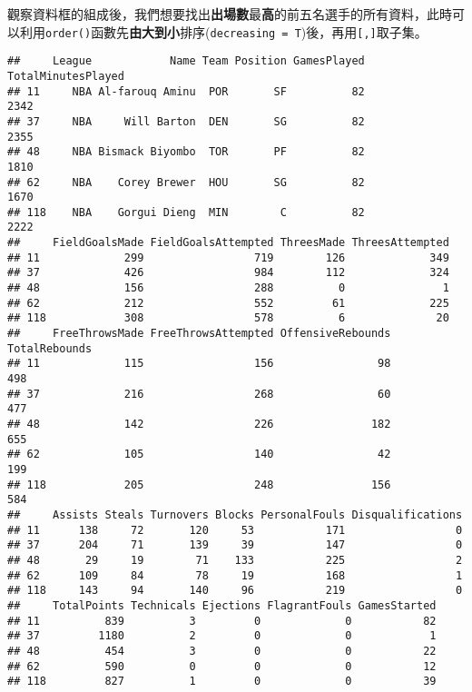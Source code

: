 \documentclass[]{book}
\newenvironment{Shaded}{\begin{snugshade}}{\end{snugshade}}
\newcommand{\KeywordTok}[1]{\textcolor[rgb]{0.13,0.29,0.53}{\textbf{{#1}}}}
\newcommand{\DataTypeTok}[1]{\textcolor[rgb]{0.13,0.29,0.53}{{#1}}}
\newcommand{\DecValTok}[1]{\textcolor[rgb]{0.00,0.00,0.81}{{#1}}}
\newcommand{\NormalTok}[1]{{#1}}
\begin{document}
觀察資料框的組成後，我們想要找出\textbf{出場數}最\textbf{高}的前五名選手的所有資料，此時可以利用\texttt{order()}函數先\textbf{由大到小}排序(\texttt{decreasing\ =\ T})後，再用\texttt{{[},{]}}取子集。

\begin{Shaded}
\end{Shaded}

\begin{verbatim}
##     League            Name Team Position GamesPlayed TotalMinutesPlayed
## 11     NBA Al-farouq Aminu  POR       SF          82               2342
## 37     NBA     Will Barton  DEN       SG          82               2355
## 48     NBA Bismack Biyombo  TOR       PF          82               1810
## 62     NBA    Corey Brewer  HOU       SG          82               1670
## 118    NBA    Gorgui Dieng  MIN        C          82               2222
##     FieldGoalsMade FieldGoalsAttempted ThreesMade ThreesAttempted
## 11             299                 719        126             349
## 37             426                 984        112             324
## 48             156                 288          0               1
## 62             212                 552         61             225
## 118            308                 578          6              20
##     FreeThrowsMade FreeThrowsAttempted OffensiveRebounds TotalRebounds
## 11             115                 156                98           498
## 37             216                 268                60           477
## 48             142                 226               182           655
## 62             105                 140                42           199
## 118            205                 248               156           584
##     Assists Steals Turnovers Blocks PersonalFouls Disqualifications
## 11      138     72       120     53           171                 0
## 37      204     71       139     39           147                 0
## 48       29     19        71    133           225                 2
## 62      109     84        78     19           168                 1
## 118     143     94       140     96           219                 0
##     TotalPoints Technicals Ejections FlagrantFouls GamesStarted
## 11          839          3         0             0           82
## 37         1180          2         0             0            1
## 48          454          3         0             0           22
## 62          590          0         0             0           12
## 118         827          1         0             0           39
\end{verbatim}
\end{document}
